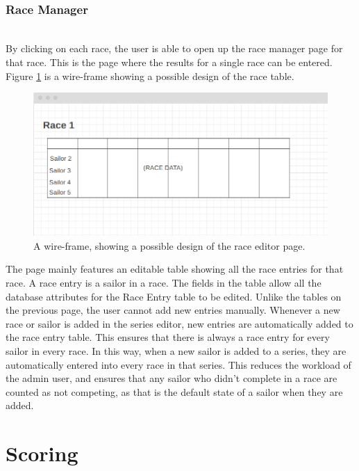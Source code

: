 \documentclass{l4proj}
\begin{document}
\hfill\\
\subsubsection{Race Manager}
\hfill\\
By clicking on each race, the user is able to open up the race manager page for that race. This is the page where the results for a single race can be entered. Figure \ref{fig:raceEditorWF} is a wire-frame showing a possible design of the race table.

\begin{figure}[h!]
    \centering
    \includegraphics[width=1\linewidth]{images/Race editor.png} 

    \caption{A wire-frame, showing a possible design of the race editor page.
    }

    \label{fig:raceEditorWF}
\end{figure}

The page mainly features an editable table showing all the race entries for that race. A race entry is a sailor in a race. The fields in the table allow all the database attributes for the Race Entry table to be edited. Unlike the tables on the previous page, the user cannot add new entries manually. Whenever a new race or sailor is added in the series editor, new entries are automatically added to the race entry table. This ensures that there is always a race entry for every sailor in every race. In this way, when a new sailor is added to a series, they are automatically entered into every race in that series. This reduces the workload of the admin user, and ensures that any sailor who didn't complete in a race are counted as not competing, as that is the default state of a sailor when they are added.

\section{Scoring}
\end{document}
